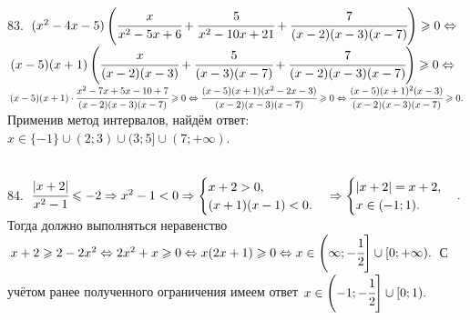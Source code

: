 \documentclass[12pt]{article}
\begin{document}
\begin{figure}[ht!]
\end{figure}\\
83. $(x^2-4x-5)\left(\cfrac{x}{x^2-5x+6}+\cfrac{5}{x^2-10x+21}+\cfrac{7}{(x-2)(x-3)(x-7)}\right)\geqslant0\Leftrightarrow$\\$
(x-5)(x+1)\left(\cfrac{x}{(x-2)(x-3)}+\cfrac{5}{(x-3)(x-7)}+\cfrac{7}{(x-2)(x-3)(x-7)}\right)\geqslant0\Leftrightarrow$\\$
(x-5)(x+1)\cdot\cfrac{x^2-7x+5x-10+7}{(x-2)(x-3)(x-7)}\geqslant0\Leftrightarrow
\cfrac{(x-5)(x+1)(x^2-2x-3)}{(x-2)(x-3)(x-7)}\geqslant0\Leftrightarrow
\cfrac{(x-5)(x+1)^2(x-3)}{(x-2)(x-3)(x-7)}\geqslant0.$ Применив метод интервалов, найдём ответ: $x\in\{-1\}\cup(2;3)\cup(3;5]\cup(7;+\infty).$
\begin{figure}[ht!]
\end{figure}\\
84. $\cfrac{|x+2|}{x^2-1}\leqslant-2\Rightarrow x^2-1<0\Rightarrow \begin{cases}x+2>0,\\ (x+1)(x-1)<0.\end{cases} \Rightarrow\begin{cases}|x+2|=x+2,\\ x\in (-1;1).\end{cases}.$ Тогда должно выполняться неравенство $x+2\geqslant 2-2x^2 \Leftrightarrow 2x^2+x \geqslant 0 \Leftrightarrow
x(2x+1)\geqslant 0 \Leftrightarrow x\in\left(\-\infty;-\cfrac{1}{2}\right]\cup[0;+\infty).$ С учётом ранее полученного ограничения имеем ответ $x\in \left(-1;-\cfrac{1}{2}\right]\cup[0;1).$\\
\end{document}
